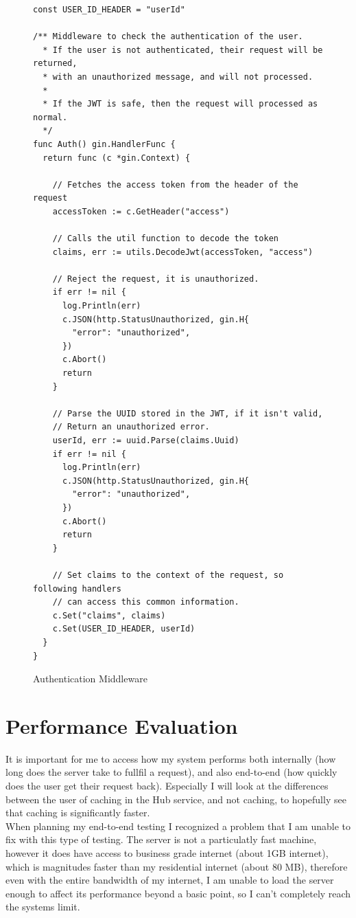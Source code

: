 \documentclass[titlepage]{article}
\begin{document}
\begin{figure}
  \begin{verbatim}
const USER_ID_HEADER = "userId"

/** Middleware to check the authentication of the user.
  * If the user is not authenticated, their request will be returned,
  * with an unauthorized message, and will not processed.
  *
  * If the JWT is safe, then the request will processed as normal.
  */
func Auth() gin.HandlerFunc {
  return func (c *gin.Context) {

    // Fetches the access token from the header of the request
    accessToken := c.GetHeader("access")

    // Calls the util function to decode the token
    claims, err := utils.DecodeJwt(accessToken, "access")

    // Reject the request, it is unauthorized.
    if err != nil {
      log.Println(err)
      c.JSON(http.StatusUnauthorized, gin.H{
        "error": "unauthorized",
      })
      c.Abort()
      return
    }

    // Parse the UUID stored in the JWT, if it isn't valid,
    // Return an unauthorized error.
    userId, err := uuid.Parse(claims.Uuid)
    if err != nil {
      log.Println(err)
      c.JSON(http.StatusUnauthorized, gin.H{
        "error": "unauthorized",
      })
      c.Abort()
      return
    }

    // Set claims to the context of the request, so following handlers
    // can access this common information.
    c.Set("claims", claims)
    c.Set(USER_ID_HEADER, userId)
  }
}
  \end{verbatim}
  \caption{Authentication Middleware}
  \label{authmiddleware}
\end{figure}

\pagebreak
\section{Performance Evaluation}
It is important for me to access how my system performs both internally (how long does the server take to fullfil a request), and also end-to-end (how quickly does the user get their request back). Especially I will look at the differences between the user of caching in the Hub service, and not caching, to hopefully see that caching is significantly faster. \\

When planning my end-to-end testing I recognized a problem that I am unable to fix with this type of testing. The server is not a particulatly fast machine, however it does have access to business grade internet (about 1GB internet), which is magnitudes faster than my residential internet (about 80 MB), therefore even with the entire bandwidth of my internet, I am unable to load the server enough to affect its performance beyond a basic point, so I can't completely reach the systems limit.
\end{document}

